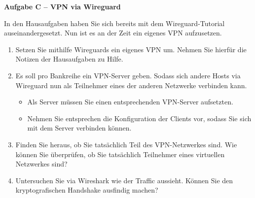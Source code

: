 \documentclass[paper=a4,fontsize=11pt]{scrartcl}%
\numberwithin{equation}{section}
\begin{document}
\begin{center}\Large{\textbf{Aufgabe C -- VPN via Wireguard}}\end{center}\vskip0.25in
In den Hausaufgaben haben Sie sich bereits mit dem Wireguard-Tutorial auseinandergesetzt. Nun ist es an der Zeit ein eigenes VPN aufzusetzen.
\begin{enumerate}
	\item Setzen Sie mithilfe Wireguards ein eigenes VPN um. Nehmen Sie hierfür die Notizen der Hausaufgaben zu Hilfe.
	\item Es soll pro Bankreihe ein VPN-Server geben. Sodass sich andere Hosts via Wireguard nun als Teilnehmer eines der anderen Netzwerke verbinden kann.
	\begin{itemize}
		\item Als Server müssen Sie einen entsprechenden VPN-Server aufsetzten. 
		\item Nehmen Sie entsprechen die Konfiguration der Clients vor, sodass Sie sich mit dem Server verbinden können.
	\end{itemize}
	\item Finden Sie heraus, ob Sie tatsächlich Teil des VPN-Netzwerkes sind. Wie können Sie überprüfen, ob Sie tatsächlich Teilnehmer eines virtuellen Netzwerkes sind?
	\item Untersuchen Sie via Wireshark wie der Traffic aussieht. Können Sie den kryptografischen Handshake ausfindig machen?
\end{enumerate}
\end{document}
